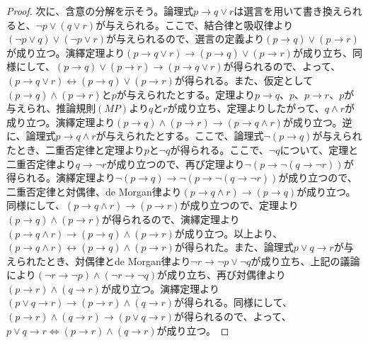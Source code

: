 \documentclass[a4paper]{jsarticle}
\begin{document}
\begin{proof}
次に、含意の分解を示そう。論理式$p \rightarrow q \vee r$は選言を用いて書き換えられると、$\neg p \vee (q \vee r)$が与えられる。ここで、結合律と吸収律より$(\neg p \vee q) \vee (\neg p \vee r)$が与えられるので、選言の定義より$(p \rightarrow q) \vee (p \rightarrow r)$が成り立つ。演繹定理より$(p \rightarrow q \vee r) \rightarrow (p \rightarrow q) \vee (p \rightarrow r)$が成り立ち、同様にして、$(p \rightarrow q) \vee (p \rightarrow r) \rightarrow (p \rightarrow q \vee r)$が得られるので、よって、$(p \rightarrow q \vee r) \leftrightarrow (p \rightarrow q) \vee (p \rightarrow r)$が得られる。また、仮定として$(p \rightarrow q) \land (p \rightarrow r)$と$p$が与えられたとする。定理より$p \rightarrow q$、$p$、$p \rightarrow r$、$p$が与えられ、推論規則$(MP)$より$q$と$r$が成り立ち、定理よりしたがって、$q \land r$が成り立つ。演繹定理より$(p \rightarrow q) \land (p \rightarrow r) \rightarrow (p \rightarrow q \land r)$が成り立つ。逆に、論理式$p \rightarrow q \land r$が与えられたとする。ここで、論理式$\neg(p \rightarrow q)$が与えられたとき、二重否定律と定理より$p$と$\neg q$が得られる。ここで、$\neg q$について、定理と二重否定律より$q \rightarrow \neg r$が成り立つので、再び定理より$\neg\left( p \rightarrow \neg(q \rightarrow \neg r) \right)$が得られる。演繹定理より$\neg(p \rightarrow q) \rightarrow \neg\left( p \rightarrow \neg(q \rightarrow \neg r) \right)$が成り立つので、二重否定律と対偶律、de Morgan律より$(p \rightarrow q \land r) \rightarrow (p \rightarrow q)$が成り立つ。同様にして、$(p \rightarrow q \land r) \rightarrow (p \rightarrow r)$が成り立つので、定理より$(p \rightarrow q) \land (p \rightarrow r)$が得られるので、演繹定理より$(p \rightarrow q \land r) \rightarrow (p \rightarrow q) \land (p \rightarrow r)$が成り立つ。以上より、$(p \rightarrow q \land r) \leftrightarrow (p \rightarrow q) \land (p \rightarrow r)$が得られた。また、論理式$p \vee q \rightarrow r$が与えられたとき、対偶律とde Morgan律より$\neg r \rightarrow \neg p \vee \neg q$が成り立ち、上記の議論により$(\neg r \rightarrow \neg p) \land (\neg r \rightarrow \neg q)$が成り立ち、再び対偶律より$(p \rightarrow r) \land (q \rightarrow r)$が成り立つ。演繹定理より$(p \vee q \rightarrow r) \rightarrow (p \rightarrow r) \land (q \rightarrow r)$が得られる。同様にして、$(p \rightarrow r) \land (q \rightarrow r) \rightarrow (p \vee q \rightarrow r)$が得られるので、よって、$p \vee q \rightarrow r \Leftrightarrow (p \rightarrow r) \land (q \rightarrow r)$が成り立つ。\par

\end{proof}
\end{document}
